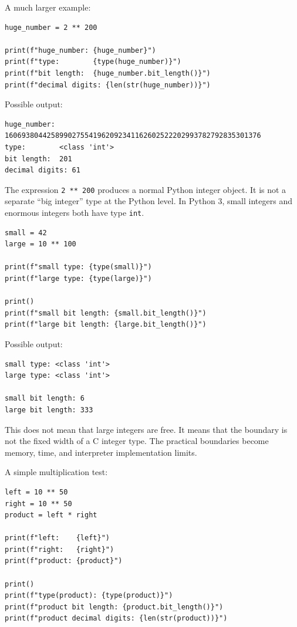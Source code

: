 A much larger example:

\begin{verbatim}
huge_number = 2 ** 200

print(f"huge_number: {huge_number}")
print(f"type:        {type(huge_number)}")
print(f"bit length:  {huge_number.bit_length()}")
print(f"decimal digits: {len(str(huge_number))}")
\end{verbatim}

Possible output:

\begin{verbatim}
huge_number: 1606938044258990275541962092341162602522202993782792835301376
type:        <class 'int'>
bit length:  201
decimal digits: 61
\end{verbatim}

The expression \texttt{2 ** 200} produces a normal Python integer object. It is not a separate ``big integer'' type at the Python level. In Python 3, small integers and enormous integers both have type \texttt{int}.

\begin{verbatim}
small = 42
large = 10 ** 100

print(f"small type: {type(small)}")
print(f"large type: {type(large)}")

print()
print(f"small bit length: {small.bit_length()}")
print(f"large bit length: {large.bit_length()}")
\end{verbatim}

Possible output:

\begin{verbatim}
small type: <class 'int'>
large type: <class 'int'>

small bit length: 6
large bit length: 333
\end{verbatim}

This does not mean that large integers are free. It means that the boundary is not the fixed width of a C integer type. The practical boundaries become memory, time, and interpreter implementation limits.

A simple multiplication test:

\begin{verbatim}
left = 10 ** 50
right = 10 ** 50
product = left * right

print(f"left:    {left}")
print(f"right:   {right}")
print(f"product: {product}")

print()
print(f"type(product): {type(product)}")
print(f"product bit length: {product.bit_length()}")
print(f"product decimal digits: {len(str(product))}")
\end{verbatim}

